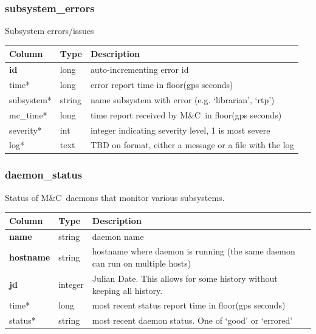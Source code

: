 \documentclass{article}
\newcommand{\mc}{M\&C}
\begin{document}
{\subsubsection{subsystem\_errors}
Subsystem errors/issues
\begin{center}
 \begin{tabular}{| p{4cm} | p{2cm} | p{10cm} |}
\hline
 {\bf Column} & {\bf Type}  & {\bf Description} \\ [0.5ex]  \hline\hline
\textbf{id} & long & auto-incrementing error id\\ \hline
time* & long & error report time in floor(gps seconds)\\ \hline
subsystem* & string & name subsystem with error (e.g. `librarian', `rtp')\\ \hline
mc\_time* & long & time report received by \mc\ in floor(gps seconds) \\ \hline
severity* & int & integer indicating severity level, 1 is most severe \\ \hline
log* & text & TBD on format, either a message or a file with the log \\ \hline
\end{tabular}
\end{center}


\subsubsection{daemon\_status}
Status of \mc\ daemons that monitor various subsystems.
\begin{center}
 \begin{tabular}{| p{4cm} | p{2cm} | p{10cm} |}
\hline
 {\bf Column} & {\bf Type}  & {\bf Description} \\ [0.5ex]  \hline\hline
\textbf{name} & string & daemon name\\ \hline
\textbf{hostname} & string & hostname where daemon is running (the same daemon can run on multiple hosts)\\ \hline
\textbf{jd} & integer & Julian Date. This allows for some history without keeping all history.\\ \hline
time* & long & most recent status report time in floor(gps seconds)\\ \hline
status* & string & most recent daemon status. One of `good' or `errored'\\ \hline
\end{tabular}
\end{center}


}
\end{document}
